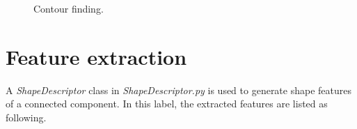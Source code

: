 \documentclass[paper=a4, fontsize=11pt]{scrartcl}
\begin{document}
\begin{figure}[h]
\centering
{} 
\caption{Contour finding.}
\label{fig:obj_cc}
\end{figure}

\section{Feature extraction}
\label{sec:feature_extraction}

A \emph{ShapeDescriptor} class in \emph{ShapeDescriptor.py} is used to generate shape features of a connected component.
In this label, the extracted features are listed as following.
\end{document}
